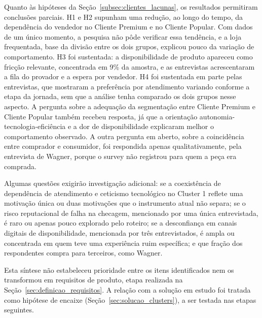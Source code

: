 Quanto às hipóteses da Seção~\ref{subsec:clientes_lacunas}, os resultados permitiram conclusões parciais. H1 e H2 supunham uma redução, ao longo do tempo, da dependência do vendedor no Cliente Premium e no Cliente Popular. Com dados de um único momento, a pesquisa não pôde verificar essa tendência, e a loja frequentada, base da divisão entre os dois grupos, explicou pouco da variação de comportamento. H3 foi sustentada: a disponibilidade de produto apareceu como fricção relevante, concentrada em 9\% da amostra, e as entrevistas acrescentaram a fila do provador e a espera por vendedor. H4 foi sustentada em parte pelas entrevistas, que mostraram a preferência por atendimento variando conforme a etapa da jornada, sem que a análise tenha comparado os dois grupos nesse aspecto. A pergunta sobre a adequação da segmentação entre Cliente Premium e Cliente Popular também recebeu resposta, já que a orientação autonomia-tecnologia-eficiência e a dor de disponibilidade explicaram melhor o comportamento observado. A outra pergunta em aberto, sobre a coincidência entre comprador e consumidor, foi respondida apenas qualitativamente, pela entrevista de Wagner, porque o survey não registrou para quem a peça era comprada.

Algumas questões exigirão investigação adicional: se a coexistência de dependência de atendimento e ceticismo tecnológico no Cluster 1 reflete uma motivação única ou duas motivações que o instrumento atual não separa; se o risco reputacional de falha na checagem, mencionado por uma única entrevistada, é raro ou apenas pouco explorado pelo roteiro; se a desconfiança em canais digitais de disponibilidade, mencionada por três entrevistados, é ampla ou concentrada em quem teve uma experiência ruim específica; e que fração dos respondentes compra para terceiros, como Wagner.

Esta síntese não estabeleceu prioridade entre os itens identificados nem os transformou em requisitos de produto, etapa realizada na Seção~\ref{sec:definicao_requisitos}. A relação com a solução em estudo foi tratada como hipótese de encaixe (Seção~\ref{sec:solucao_clusters}), a ser testada nas etapas seguintes.
